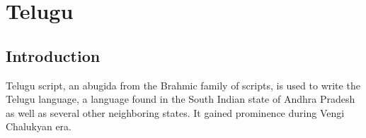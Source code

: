 \chapter{Telugu}
\section{Introduction}

Telugu script, an abugida from the Brahmic family of scripts, is used to write
the Telugu language, a language found in the South Indian state of Andhra
Pradesh as well as several other neighboring states. It gained prominence
during Vengi Chalukyan era.
